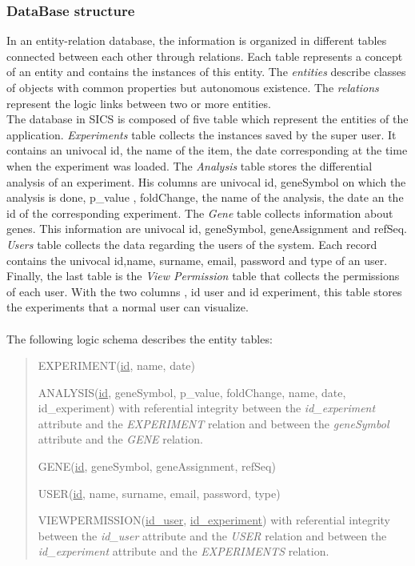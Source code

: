 \documentclass[a4paper]{report}
\begin{document}
\subsubsection{DataBase structure}

In an entity-relation database, the information is organized in different tables connected between each other through relations. Each table represents a concept of an entity and contains the instances of this entity. The \emph{entities} describe classes of objects with common properties but autonomous existence. The \emph{relations} represent the logic links between two or more entities.\\
The database in SICS is composed of five table which represent the entities of the application. \emph{Experiments} table collects the instances saved by the super user. It contains an univocal id, the name of the item, the date corresponding at the time when the experiment was loaded. The \emph{Analysis} table stores the differential analysis of an experiment. His columns are	univocal id, geneSymbol on which the analysis is done, p\_value , foldChange, the name of the analysis, the date an the id of the corresponding experiment. 
The \emph{Gene} table collects information about genes. This information are 	univocal id, geneSymbol, geneAssignment and refSeq.
\emph{Users} table collects the data regarding the users of the system. Each record contains the univocal id,name, surname, email, password and type of an user.
 Finally, the last table is the \emph{View Permission} table that collects the permissions of each user. With the two columns , id user and id experiment, this table stores the experiments that a normal user can visualize.\\

\paragraph{}The following logic schema describes the entity tables:
\begin{quote}
\item EXPERIMENT(\underline{id}, name, date) 
\item ANALYSIS(\underline{id}, geneSymbol, p\_value, foldChange, name, date, id\_experiment) with referential integrity between the \emph{id\_experiment} attribute and the \emph{EXPERIMENT} relation and between the \emph{geneSymbol} attribute and the \emph{GENE} relation.
\item GENE(\underline{id}, geneSymbol, geneAssignment, refSeq) 
\item USER(\underline{id}, name, surname, email, password, type) 
\item VIEWPERMISSION(\underline{id\_user}, \underline{id\_experiment})  with referential integrity between the \emph{id\_user} attribute and the \emph{USER} relation and between the \emph{id\_experiment} attribute and the \emph{EXPERIMENTS} relation.
\end{quote}
\end{document}
